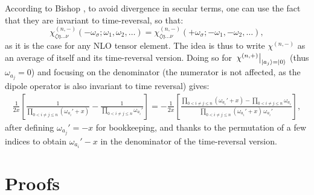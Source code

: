 \documentclass[12pt,a4paper]{article}
\begin{document}
According to Bishop \cite{bishopExplicitNondivergentFormulas1994}, to avoid divergence in secular terms, one can use the fact that they are invariant to time-reversal, so that:\begin{equation*}
	\chi^{(n,-)}_{\zeta \eta \ldots \nu}(-\omega_\sigma; \omega_1, \omega_2, \ldots)  = \chi^{(n,-)}_{\zeta \eta \ldots \nu}(+\omega_\sigma; -\omega_1, -\omega_2,\ldots),
\end{equation*}
as it is the case for any NLO tensor element. The idea is thus to write $\chi^{(n,-)}$ as an average of itself and its time-reversal version. Doing so for $\left. \chi^{(n,+)} \right|_{\ket{a_j} = \ket{0}}$ (thus $\omega_{a_j} = 0$) and focusing on the denominator (the numerator is not affected, as the dipole operator is also invariant to time reversal) gives:\begin{align*}
 	\frac{1}{2x}\left[
	 \frac{1}{\prod_{0 < i\neq j \leq n} (\omega_{a_i}'+x) } - \frac{1}{{\prod_{0 < i\neq j \leq n} \omega_{a_i}'}}
	\right] = -\frac{1}{2x}\left[
	\frac{\prod_{0 < i\neq j \leq n} (\omega_{a_i}'+x) - \prod_{0 < i\neq j \leq n} \omega_{a_i}}{\prod_{0 < i\neq j \leq n} (\omega_{a_i}'+x)\,\omega_{a_i}'}
	\right],
\end{align*}
after defining $\omega_{a_j}'=-x$ for bookkeeping, and thanks to the permutation of a few indices to obtain $\omega_{a_i}'-x$ in the denominator of the time-reversal version. 


\appendix
\section{Proofs}
\end{document}
